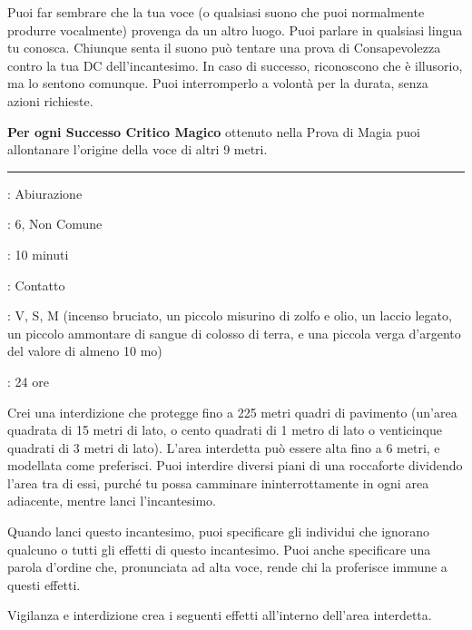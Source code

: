 \begin{multicols}{2}
Puoi far sembrare che la tua voce (o qualsiasi suono che puoi normalmente produrre vocalmente) provenga da un altro luogo. Puoi parlare in qualsiasi lingua tu conosca. Chiunque senta il suono può tentare una prova di Consapevolezza contro la tua DC dell'incantesimo. In caso di successo, riconoscono che è illusorio, ma lo sentono comunque. Puoi interromperlo a volontà per la durata, senza azioni richieste.

\textbf{Per ogni Successo Critico Magico} ottenuto nella Prova di Magia puoi allontanare l'origine della voce di altri 9 metri.

\smallskip\noindent\rule{\linewidth}{2pt} \hypertarget{Vigilanza e Interdizione}{}\smallskip{}
\noindent
\begin{description}[noitemsep, topsep=0pt, parsep=0pt, partopsep=0pt, leftmargin=0cm, labelwidth=2.8cm]
	\item[\textbf{Lista di Magia}]: Abiurazione
	\item[\textbf{Livello}]: 6, Non Comune
	\item[\textbf{T. di Lancio}]: 10 minuti
	\item[\textbf{Gittata}]: Contatto
	\item[\textbf{Componenti}]: V, S, M (incenso bruciato, un piccolo misurino di zolfo e olio, un laccio legato, un piccolo ammontare di sangue di colosso di terra, e una piccola verga d'argento del valore di almeno 10 mo)
	\item[\textbf{Durata}]: 24 ore
\end{description}

Crei una interdizione che protegge fino a 225 metri quadri di pavimento (un'area quadrata di 15 metri di lato, o cento quadrati di 1 metro di lato o venticinque quadrati di 3 metri di lato). L'area interdetta può essere alta fino a 6 metri, e modellata come preferisci. Puoi interdire diversi piani di una roccaforte dividendo l'area tra di essi, purché tu possa camminare ininterrottamente in ogni area adiacente, mentre lanci l'incantesimo.

Quando lanci questo incantesimo, puoi specificare gli individui che ignorano qualcuno o tutti gli effetti di questo incantesimo. Puoi anche specificare una parola d'ordine che, pronunciata ad alta voce, rende chi la proferisce immune a questi effetti.

Vigilanza e interdizione crea i seguenti effetti all'interno dell'area interdetta.


\end{multicols}
